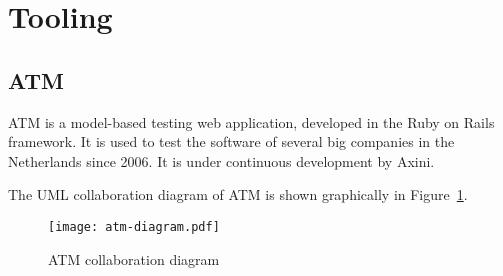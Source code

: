\section{Tooling}\label{sec:tooling}

\subsection{ATM}\label{sec:atm}
ATM is a model-based testing web application, developed in the Ruby on Rails framework. It is used to test the software of several big companies in the Netherlands since 2006. It is under continuous development by Axini.

The UML collaboration diagram of ATM is shown graphically in Figure~\ref{fig:axini_tool}.

\begin{figure}[ht]
  \begin{center}
    \texttt{[image: atm-diagram.pdf]}
  \end{center}
  \caption{ATM collaboration diagram}
  \label{fig:axini_tool}
\end{figure}

